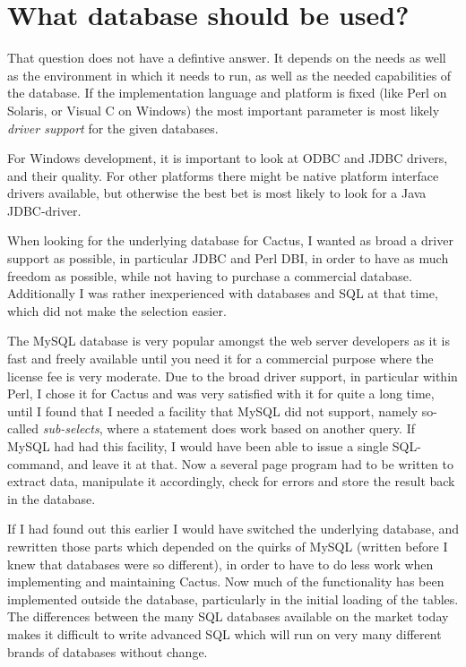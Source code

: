 

\section{What database should be used?}

That question does not have a defintive answer.  It depends on the
needs as well as the environment in which it needs to run, as well as
the needed capabilities of the database.  If the implementation
language and platform is fixed (like Perl on Solaris, or Visual C on
Windows) the most important parameter is most likely \textit{driver
support} for the given databases.

For Windows development, it is important to look at ODBC and JDBC
drivers, and their quality.  For other platforms there might be native
platform interface drivers available, but otherwise the best bet is
most likely to look for a Java JDBC-driver.

When looking for the underlying database for Cactus, I wanted as broad
a driver support as possible, in particular JDBC and Perl DBI, in
order to have as much freedom as possible, while not having to
purchase a commercial database.  Additionally I was rather
inexperienced with databases and SQL at that time, which did not make
the selection easier.

The MySQL database is very popular amongst the web server developers
as it is fast and freely available until you need it for a commercial
purpose where the license fee is very moderate.   Due to the broad
driver support, in particular within Perl, I chose it for Cactus and
was very satisfied with it for quite a long time, until I found that I
needed a facility that MySQL did not support, namely so-called
\textit{sub-selects}, where a statement does work based on another
query.   If MySQL had had this facility, I would have been able to
issue a single SQL-command, and leave it at that.  Now a several page
program had to be written to extract data, manipulate it accordingly,
check for errors and store the result back in the database.

If I had found out this earlier I would have switched the underlying
database, and rewritten those parts which depended on the quirks of
MySQL (written before I knew that databases were so different), in
order to have to do less work when implementing and maintaining
Cactus.  Now much of the functionality has been implemented outside
the database, particularly in the initial loading of the tables.  The
differences between the many SQL databases available on the market
today makes it difficult to write advanced SQL which will run on very
many different brands of databases without change.

